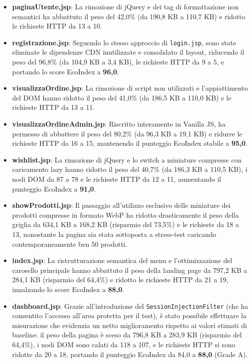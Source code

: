 \begin{itemize}
    \item \textbf{paginaUtente.jsp}: La rimozione di jQuery e dei tag di formattazione non semantici ha abbattuto il peso del 42,0\% (da 190,8 KB a 110,7 KB) e ridotto le richieste HTTP da 13 a 10.
    \item \textbf{registrazione.jsp}: Seguendo lo stesso approccio di \texttt{login.jsp}, sono state eliminate le dipendenze CDN inutilizzate e consolidato il layout, riducendo il peso del 96,8\% (da 104,9 KB a 3,4 KB), le richieste HTTP da 9 a 5, e portando lo score EcoIndex a \textbf{96,0}.
    \item \textbf{visualizzaOrdine.jsp}: La rimozione di script non utilizzati e l'appiattimento del DOM hanno ridotto il peso del 41,0\% (da 186,5 KB a 110,0 KB) e le richieste HTTP da 13 a 11.
    \item \textbf{visualizzaOrdineAdmin.jsp}: Riscritto interamente in Vanilla JS, ha permesso di abbattere il peso del 80,2\% (da 96,3 KB a 19,1 KB) e ridurre le richieste HTTP da 16 a 15, mantenendo il punteggio EcoIndex stabile a \textbf{95,0}.
    \item \textbf{wishlist.jsp}: La rimozione di jQuery e lo switch a miniature compresse con caricamento lazy hanno ridotto il peso del 40,7\% (da 186,3 KB a 110,5 KB), i nodi DOM da 87 a 78 e le richieste HTTP da 12 a 11, aumentando il punteggio EcoIndex a \textbf{91,0}.
    \item \textbf{showProdotti.jsp}: Il passaggio all'utilizzo esclusivo delle miniature dei prodotti compresse in formato WebP ha ridotto drasticamente il peso della griglia da 634,1 KB a 168,2 KB (risparmio del 73,5\%) e le richieste da 18 a 13, nonostante la pagina sia stata sottoposta a stress-test caricando contemporaneamente ben 50 prodotti.
    \item \textbf{index.jsp}: La ristrutturazione semantica del menu e l'ottimizzazione del carosello principale hanno abbattuto il peso della landing page da 797,2 KB a 284,1 KB (risparmio del 64,4\%) e ridotto le richieste HTTP da 21 a 19, innalzando lo score EcoIndex a \textbf{88,0}.
    \item \textbf{dashboard.jsp}: Grazie all'introduzione del \texttt{SessionInjectionFilter} (che ha consentito l'accesso all'area protetta per il test), è stato possibile effettuare la misurazione che evidenzia un netto miglioramento rispetto ai valori stimati di baseline: il peso della pagina è sceso da 796,8 KB a 283,9 KB (risparmio del 64,4\%), i nodi DOM sono calati da 118 a 107, e le richieste HTTP si sono ridotte da 20 a 18, portando il punteggio EcoIndex da 84,0 a \textbf{88,0} (Grade A).
\end{itemize}

